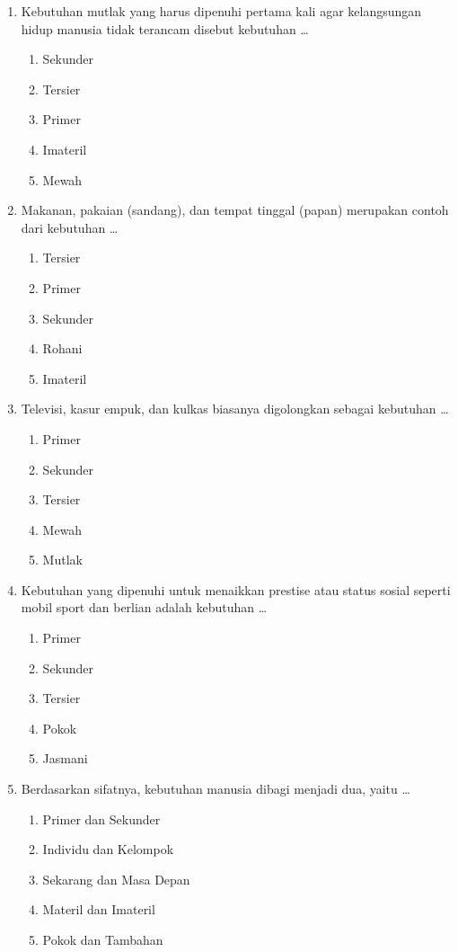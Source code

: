 \documentclass[12pt,a4paper]{article}
\begin{document}
\begin{enumerate}[leftmargin=*]
\item Kebutuhan mutlak yang harus dipenuhi pertama kali agar kelangsungan hidup manusia tidak terancam disebut kebutuhan \dots
    \begin{enumerate}[label=\alph*.]
        \item Sekunder
        \item Tersier
        \item Primer
        \item Imateril
        \item Mewah
    \end{enumerate}

\item Makanan, pakaian (sandang), dan tempat tinggal (papan) merupakan contoh dari kebutuhan \dots
    \begin{enumerate}[label=\alph*.]
        \item Tersier
        \item Primer
        \item Sekunder
        \item Rohani
        \item Imateril
    \end{enumerate}

\item Televisi, kasur empuk, dan kulkas biasanya digolongkan sebagai kebutuhan \dots
    \begin{enumerate}[label=\alph*.]
        \item Primer
        \item Sekunder
        \item Tersier
        \item Mewah
        \item Mutlak
    \end{enumerate}

\item Kebutuhan yang dipenuhi untuk menaikkan prestise atau status sosial seperti mobil sport dan berlian adalah kebutuhan \dots
    \begin{enumerate}[label=\alph*.]
        \item Primer
        \item Sekunder
        \item Tersier
        \item Pokok
        \item Jasmani
    \end{enumerate}

\item Berdasarkan sifatnya, kebutuhan manusia dibagi menjadi dua, yaitu \dots
    \begin{enumerate}[label=\alph*.]
        \item Primer dan Sekunder
        \item Individu dan Kelompok
        \item Sekarang dan Masa Depan
        \item Materil dan Imateril
        \item Pokok dan Tambahan
    \end{enumerate}


\end{enumerate}
\end{document}
